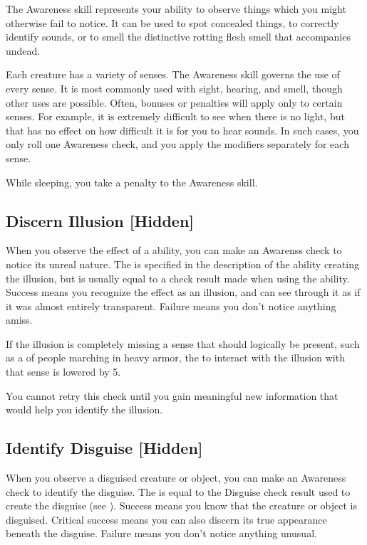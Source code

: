 \newpage
{}
    The Awareness skill represents your ability to observe things which you might otherwise fail to notice. It can be used to spot concealed things, to correctly identify sounds, or to smell the distinctive rotting flesh smell that accompanies undead.

    Each creature has a variety of senses. The Awareness skill governs the use of every sense. It is most commonly used with sight, hearing, and smell, though other uses are possible. Often, bonuses or penalties will apply only to certain senses. For example, it is extremely difficult to see when there is no light, but that has no effect on how difficult it is for you to hear sounds. In such cases, you only roll one Awareness check, and you apply the modifiers separately for each sense.

    While sleeping, you take a  penalty to the Awareness skill.

    \subsection{Discern Illusion [Hidden]}
        When you observe the effect of a  ability, you can make an Awarenss check to notice its unreal nature.
        The  is specified in the description of the ability creating the illusion, but is usually equal to a check result made when using the ability.
        Success means you recognize the effect as an illusion, and can see through it as if it was almost entirely transparent.
        Failure means you don't notice anything amiss.

        If the illusion is completely missing a sense that should logically be present, such as a  of people marching in heavy armor, the  to interact with the illusion with that sense is lowered by 5.

        You cannot retry this check until you gain meaningful new information that would help you identify the illusion.

    \subsection{Identify Disguise [Hidden]}\label{Identify Disguise}
        When you observe a disguised creature or object, you can make an Awareness check to identify the disguise.
        The  is equal to the Disguise check result used to create the disguise (see ).
        Success means you know that the creature or object is disguised.
        Critical success means you can also discern its true appearance beneath the disguise.
        Failure means you don't notice anything unusual.

